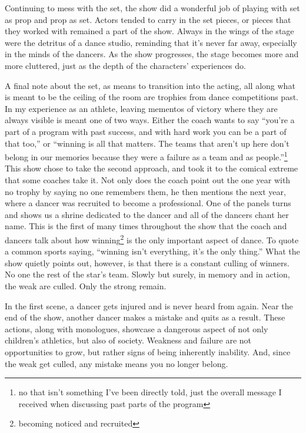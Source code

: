 \documentclass[12pt]{article}[titlepage]
\newcommand{\say}[1]{``#1''}
\newcommand{\1}{\={a}}
\newcommand{\2}{\={e}}
\newcommand{\3}{\={\i}}
\newcommand{\4}{\=o}
\newcommand{\5}{\=u}
\newcommand{\6}{\={A}}
\renewcommand{\,}{\textsuperscript{,}}
\begin{document}
Continuing to mess with the set, the show did a wonderful job of playing with set as prop and prop as set.
Actors tended to carry in the set pieces, or pieces that they worked with remained a part of the show.
Always in the wings of the stage were the detritus of a dance studio, reminding that it's never far away, especially in the minds of the dancers.
As the show progresses, the stage becomes more and more cluttered, just as the depth of the characters' experiences do.

A final note about the set, as means to transition into the acting, all along what is meant to be the ceiling of the room are trophies from dance competitions past.
In my experience as an athlete, leaving mementos of victory where they are always visible is meant one of two ways.
Either the coach wants to say \say{you're a part of a program with past success, and with hard work you can be a part of that too,} or \say{winning is all that matters. The teams that aren't up here don't belong in our memories because they were a failure as a team and as people.}\footnote{no that isn't something I've been directly told, just the overall message I received when discussing past parts of the program}
This show chose to take the second approach, and took it to the comical extreme that some coaches take it.
Not only does the coach point out the one year with no trophy by saying no one remembers them, he then mentions the next year, where a dancer was recruited to become a professional.
One of the panels turns and shows us a shrine dedicated to the dancer and all of the dancers chant her name.
This is the first of many times throughout the show that the coach and dancers talk about how winning\footnote{becoming noticed and recruited} is the only important aspect of dance.
To quote a common sports saying, \say{winning isn't everything, it's the only thing.}
What the show quietly points out, however, is that there is a constant culling of winners.
No one the rest of the star's team.
Slowly but surely, in memory and in action, the weak are culled.
Only the strong remain.

In the first scene, a dancer gets injured and is never heard from again.
Near the end of the show, another dancer makes a mistake and quits as a result. 
These actions, along with monologues, showcase a dangerous aspect of not only children's athletics, but also of society.
Weakness and failure are not opportunities to grow, but rather signs of being inherently inability.
And, since the weak get culled, any mistake means you no longer belong.
\end{document}
